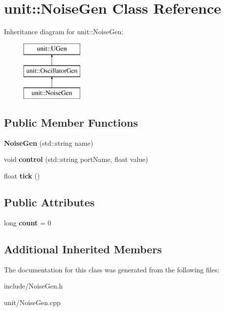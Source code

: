 \hypertarget{classunit_1_1NoiseGen}{}\section{unit\+:\+:Noise\+Gen Class Reference}
\label{classunit_1_1NoiseGen}
Inheritance diagram for unit\+:\+:Noise\+Gen\+:\begin{figure}[H]
\begin{center}
\leavevmode
\includegraphics[height=3.000000cm]{classunit_1_1NoiseGen}
\end{center}
\end{figure}
\subsection*{Public Member Functions}
\begin{DoxyCompactItemize}
\item 
{\bfseries Noise\+Gen} (std\+::string name)\hypertarget{classunit_1_1NoiseGen_aa49d8817fff2757abc19f0dffea0c7fe}{}\label{classunit_1_1NoiseGen_aa49d8817fff2757abc19f0dffea0c7fe}

\item 
void {\bfseries control} (std\+::string port\+Name, float value)\hypertarget{classunit_1_1NoiseGen_a73628ae13d893658b88bc30eb43437ba}{}\label{classunit_1_1NoiseGen_a73628ae13d893658b88bc30eb43437ba}

\item 
float {\bfseries tick} ()\hypertarget{classunit_1_1NoiseGen_addaecf96df1cf9f1ba4875fb849949df}{}\label{classunit_1_1NoiseGen_addaecf96df1cf9f1ba4875fb849949df}

\end{DoxyCompactItemize}
\subsection*{Public Attributes}
\begin{DoxyCompactItemize}
\item 
long {\bfseries count} = 0\hypertarget{classunit_1_1NoiseGen_a9509da6dba8e294d3e5bc26d2eb6d39f}{}\label{classunit_1_1NoiseGen_a9509da6dba8e294d3e5bc26d2eb6d39f}

\end{DoxyCompactItemize}
\subsection*{Additional Inherited Members}


The documentation for this class was generated from the following files\+:\begin{DoxyCompactItemize}
\item 
include/Noise\+Gen.\+h\item 
unit/Noise\+Gen.\+cpp\end{DoxyCompactItemize}
